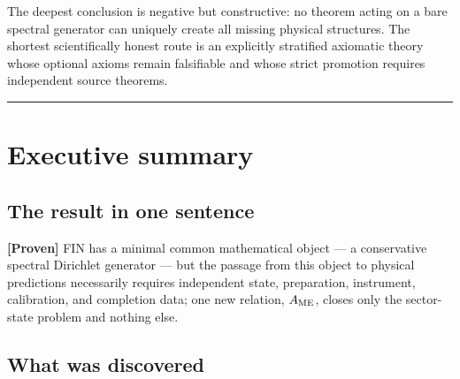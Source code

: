 \documentclass[11pt,a4paper,openany]{report}
\newcommand{\statusProven}{\textcolor{fingreen}{[Proven]}}
\begin{document}
The deepest conclusion is negative but constructive: no theorem acting on a bare spectral generator can uniquely create all missing physical structures. The shortest scientifically honest route is an explicitly stratified axiomatic theory whose optional axioms remain falsifiable and whose strict promotion requires independent source theorems.

\par\medskip\hrule\medskip

\chapter{Executive summary}

\section{The result in one sentence}

\textbf{\statusProven{}} FIN has a minimal common mathematical object --- a conservative spectral Dirichlet generator --- but the passage from this object to physical predictions necessarily requires independent state, preparation, instrument, calibration, and completion data; one new relation, \(A_{\rm ME}\), closes only the sector-state problem and nothing else.

\section{What was discovered}
\end{document}
